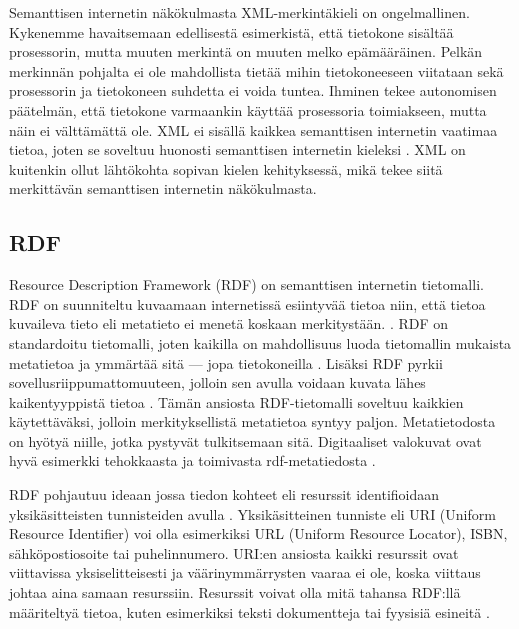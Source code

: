 \documentclass[finnish, 12pt, a4paper, elec, utf8, pdfa, online]{aaltothesis}
\begin{document}
 Semanttisen internetin näkökulmasta XML-merkintäkieli on ongelmallinen. Kykenemme havaitsemaan edellisestä esimerkistä, että tietokone sisältää prosessorin, mutta muuten merkintä on muuten melko epämääräinen. Pelkän merkinnän pohjalta ei ole mahdollista tietää mihin tietokoneeseen viitataan sekä prosessorin ja tietokoneen suhdetta ei voida tuntea. Ihminen tekee autonomisen päätelmän, että tietokone varmaankin käyttää prosessoria toimiakseen, mutta näin ei välttämättä ole. XML ei sisällä kaikkea semanttisen internetin vaatimaa tietoa, joten se soveltuu huonosti semanttisen internetin kieleksi \cite{IEEE_XML}. XML on kuitenkin ollut lähtökohta sopivan kielen kehityksessä, mikä tekee siitä merkittävän semanttisen internetin näkökulmasta.

\subsection{RDF}
Resource Description Framework (RDF) on semanttisen internetin tietomalli. RDF on suunniteltu kuvaamaan internetissä esiintyvää tietoa niin, että tietoa kuvaileva tieto eli metatieto ei menetä koskaan merkitystään. \cite{RDF_specification}. RDF on standardoitu tietomalli, joten kaikilla on mahdollisuus luoda tietomallin mukaista metatietoa ja ymmärtää sitä — jopa tietokoneilla \cite{metadata}. Lisäksi RDF pyrkii sovellusriippumattomuuteen, jolloin sen avulla voidaan kuvata lähes kaikentyyppistä tietoa \cite{RDF_specification}. Tämän ansiosta RDF-tietomalli soveltuu kaikkien käytettäväksi, jolloin merkityksellistä metatietoa syntyy paljon. Metatietodosta on hyötyä niille, jotka pystyvät tulkitsemaan sitä. Digitaaliset valokuvat ovat hyvä esimerkki tehokkaasta ja toimivasta rdf-metatiedosta  \cite{XMP} \cite{profium_metadata}.

RDF pohjautuu ideaan jossa tiedon kohteet eli resurssit identifioidaan yksikäsitteisten tunnisteiden avulla \cite{RDF_specification}. Yksikäsitteinen tunniste eli URI (Uniform Resource Identifier) voi olla esimerkiksi URL (Uniform Resource Locator), ISBN, sähköpostiosoite tai puhelinnumero. URI:en ansiosta kaikki resurssit ovat viittavissa yksiselitteisesti ja väärinymmärrysten vaaraa ei ole, koska viittaus johtaa aina samaan resurssiin. Resurssit voivat olla mitä tahansa RDF:llä määriteltyä tietoa, kuten esimerkiksi teksti dokumentteja tai fyysisiä esineitä \cite{RDF_specification}.
\end{document}
